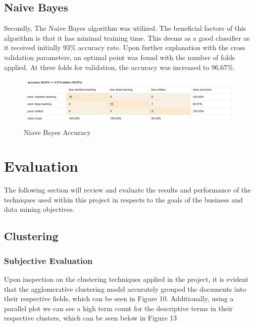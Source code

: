 \subsection*{Naive Bayes}
Secondly, The Naive Bayes algorithm was utilized. The beneficial factors of this algorithm is that it has minimal training time.   This deems as a good classifier as it received initially 93\% accuracy rate. Upon further explanation with the cross validation parameters, an optimal point was found with the number of folds applied. At three folds for validation, the accuracy was increased to 96.67\%. 

\begin{figure}[ht]
	\begin{center}
		\advance\leftskip-3cm
		\advance\rightskip-3cm
		\includegraphics[keepaspectratio=true,scale=0.7]{__resources/bayes1.JPG}
		\caption{Niave Bayes Accuracy}
		\label{stop}
	\end{center}
\end{figure}

\section*{Evaluation}
The following section will review and evaluate the results and performance of the techniques used within this project in respects to the goals of the business and data mining objectives.

\subsection*{Clustering}
\subsubsection*{Subjective Evaluation}
Upon inspection on the clustering techniques applied in the project, it is evident that the agglomerative clustering model accurately grouped the documents into their respective fields, which can be seen in Figure 10.
Additionally, using a parallel plot we can see a high term count for the descriptive terms in their respective clusters, which can be seen below in Figure 13

